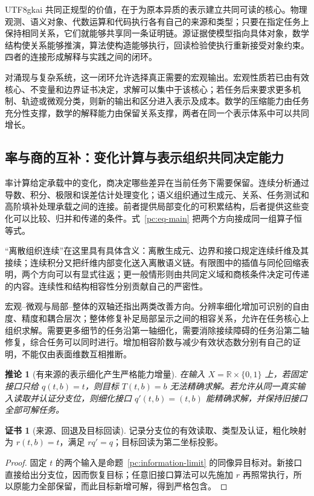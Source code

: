 \documentclass[11pt,a4paper]{article}
\theoremstyle{plain}
\newtheorem{corollary}[theorem]{推论}
\theoremstyle{definition}
\newtheorem*{certificate}{证书}
\theoremstyle{remark}
\begin{document}
\begin{CJK*}{UTF8}{gkai}
共同正规型的价值，在于为原本异质的表示建立共同可读的核心。物理观测、语义对象、代数运算和代码执行各有自己的来源和类型；只要在指定任务上保持相同关系，它们就能够共享同一条证明链。源证据使模型指向具体对象，数学结构使关系能够推演，算法使构造能够执行，回读检验使执行重新接受对象约束。四者的连接形成解释与实践之间的闭环。

对涌现与复杂系统，这一闭环允许选择真正需要的宏观输出。宏观性质若已由有效核心、不变量和边界证书决定，求解可以集中于该核心；若任务后来要求更多机制、轨迹或微观分类，则新的输出和区分进入表示及成本。数学的压缩能力由任务充分性支撑，数学的解释能力由保留关系支撑，两者在同一个表示体系中可以共同增长。

\subsection{率与商的互补：变化计算与表示组织共同决定能力}

率计算给定承载中的变化，商决定哪些差异在当前任务下需要保留。连续分析通过导数、积分、极限和误差估计处理变化；语义组织通过生成元、关系、任务测试和高阶填补处理承载之间的连接。前者提供局部变化的可积累结构，后者提供这些变化可以比较、归并和传递的条件。式~\eqref{pc:eq-main} 把两个方向接成同一组算子恒等式。

“离散组织连续”在这里具有具体含义：离散生成元、边界和接口规定连续纤维及其接续；连续积分又把纤维内部变化送入离散语义链。有限图中的插值与同伦回缩表明，两个方向可以有显式往返；更一般情形则由共同定义域和商核条件决定可传递的内容。连续性和结构相容性分别贡献自己的严密性。

宏观--微观与局部--整体的双轴还指出两类改善方向。分辨率细化增加可识别的自由度、精度和耦合层次；整体修复补足局部呈示之间的相容关系，允许在任务核心上组织求解。需要更多细节的任务沿第一轴细化，需要消除接续障碍的任务沿第二轴修复，综合任务可以同时进行。增加相容阶数与减少有效状态数分别有自己的证明，不能仅由表面维数互相推断。

\begin{corollary}[有来源的表示细化产生严格能力增量]
\label{pc:capability}
在输入 $X=\mathbb R\times\{0,1\}$ 上，若固定接口只给 $q(t,b)=t$，则目标 $T(t,b)=b$ 无法精确求解。若允许从同一真实输入读取并认证分支位，则细化接口 $q'(t,b)=(t,b)$ 能精确求解，并保持旧接口全部可解任务。
\end{corollary}
\begin{certificate}[来源、回退及目标回读]
记录分支位的有效读取、类型及认证，粗化映射为 $r(t,b)=t$，满足 $rq'=q$；目标回读为第二坐标投影。
\end{certificate}
\begin{proof}
固定 $t$ 的两个输入是命题~\ref{pc:information-limit} 的同像异目标对。新接口直接给出分支位，因而恢复目标；任意旧接口算法可以先施加 $r$ 再照常执行，所以原能力全部保留，而此目标新增可解，得到严格包含。
\end{proof}


\end{CJK*}
\end{document}
